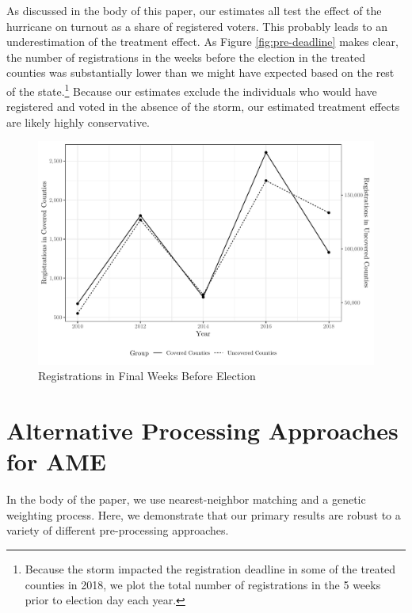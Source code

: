 \documentclass[
  12pt,
]{article}
\begin{document}
As discussed in the body of this paper, our estimates all test the effect of the hurricane on turnout as a share of registered voters. This probably leads to an underestimation of the treatment effect. As Figure \ref{fig:pre-deadline} makes clear, the number of registrations in the weeks before the election in the treated counties was substantially lower than we might have expected based on the rest of the state.\footnote{Because the storm impacted the registration deadline in some of the treated counties in 2018, we plot the total number of registrations in the 5 weeks prior to election day each year.} Because our estimates exclude the individuals who would have registered and voted in the absence of the storm, our estimated treatment effects are likely highly conservative.

\begin{figure}[H]

{\centering \includegraphics{si_files/figure-latex/regs-chunk-1} 

}

\caption{\label{fig:pre-deadline}Registrations in Final Weeks Before Election}\label{fig:regs-chunk}
\end{figure}

\hypertarget{alternative-processing-approaches-for-ame}{%
\section*{Alternative Processing Approaches for AME}\label{alternative-processing-approaches-for-ame}}

In the body of the paper, we use nearest-neighbor matching and a genetic weighting process. Here, we demonstrate that our primary results are robust to a variety of different pre-processing approaches.
\end{document}
